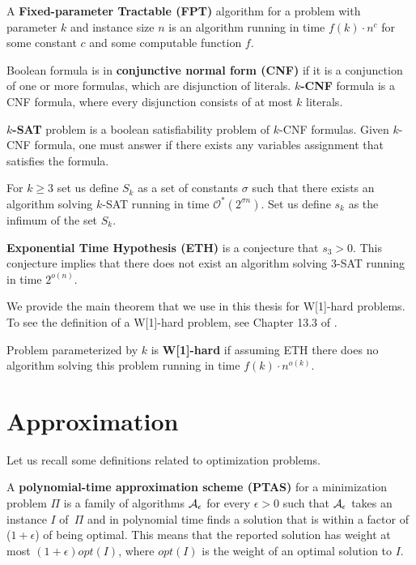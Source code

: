 \begin{defi}
A \textbf{Fixed-parameter Tractable (FPT)} algorithm 
for a problem with parameter $k$ and instance size $n$
is an algorithm running in time $f(k) \cdot n^c$
for some constant $c$ and some computable function $f$.
\end{defi}

\begin{defi}
\label{definition:cnf}
Boolean formula is in \textbf{conjunctive normal form (CNF)} if
it is a conjunction of one or more formulas,
which are disjunction of literals.
\textbf{$k$-CNF} formula is a CNF formula, where
every disjunction consists of at most $k$ literals.
\end{defi}

\begin{defi}
\textbf{$k$-SAT} problem is 
a boolean satisfiability problem of $k$-CNF formulas.
Given $k$-CNF formula, one must answer if there
exists any variables assignment that satisfies the formula.
\end{defi}

\begin{defi}
For $k \ge 3$ set us define $S_k$ as a set of constants $\sigma$
such that there exists an algorithm solving $k$-SAT running in time
$\mathcal{O}^{*}(2^{\sigma n})$.
Set us define $s_k$ as the infimum  of the set $S_k$.

\textbf{Exponential Time Hypothesis (ETH)} is a conjecture
that $s_3 > 0$. This conjecture implies that
there does not exist an algorithm solving 3-SAT
running in time $2^{o(n)}$.
\end{defi}

We provide the main theorem that we use in this thesis for W[1]-hard
problems. To see the definition of a W[1]-hard problem,
see Chapter 13.3 of \cite{platypus_book}.

\begin{tw}
Problem parameterized by $k$ is \textbf{W[1]-hard} if assuming ETH there
does no algorithm solving this problem running in time
$f(k)\cdot n^{o(k)}$.
\end{tw}

\section{Approximation}

Let us recall some definitions related to optimization problems.

\begin{defi}
A \textbf{polynomial-time approximation scheme (PTAS)}
for a minimization problem $\Pi$
is a family of algorithms $\cal{A}_\epsilon$ for
every $\epsilon > 0$
such that $\cal{A}_\epsilon$ takes an instance $I$ of~$\Pi$
and in polynomial time
finds a solution that is within a factor
of ($1+\epsilon$) of being optimal.
This means that the reported solution has weight at most
$(1+\epsilon)opt(I)$, where $opt(I)$ is the weight
of an optimal solution to $I$.
\end{defi}

